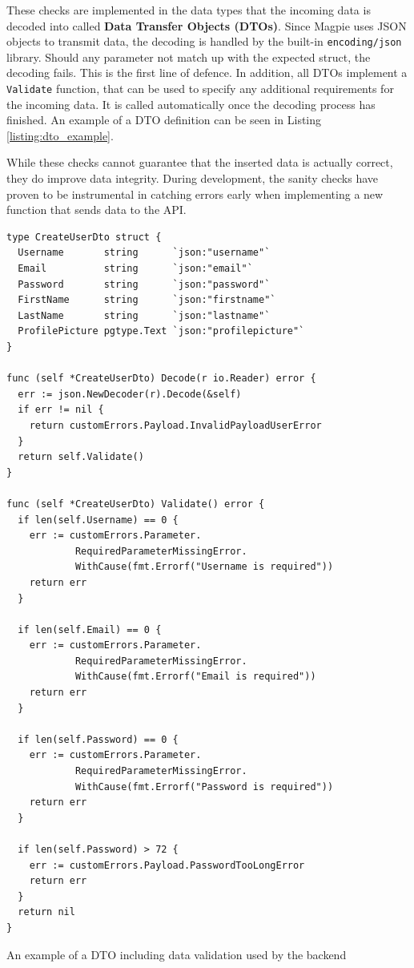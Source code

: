 These checks are implemented in the data types that the incoming data is decoded
into called \textbf{Data Transfer Objects (DTOs)}. Since Magpie uses JSON
objects to transmit data, the decoding is handled by the built-in
\texttt{encoding/json} library. Should any parameter not match up with the
expected struct, the decoding fails. This is the first line of defence. In
addition, all DTOs implement a \texttt{Validate} function, that can be used to
specify any additional requirements for the incoming data. It is called
automatically once the decoding process has finished. An example of a DTO
definition can be seen in Listing \ref{listing:dto_example}.

While these checks cannot guarantee that the inserted data is actually correct,
they do improve data integrity. During development, the sanity checks have
proven to be instrumental in catching errors early when implementing a new
function that sends data to the API.

\newpage{}

\begin{listing}[htbp]
  \centering{}
  \begin{minipage}{0.75\textwidth}
  \begin{verbatim}
type CreateUserDto struct {
  Username       string      `json:"username"`
  Email          string      `json:"email"`
  Password       string      `json:"password"`
  FirstName      string      `json:"firstname"`
  LastName       string      `json:"lastname"`
  ProfilePicture pgtype.Text `json:"profilepicture"`
}

func (self *CreateUserDto) Decode(r io.Reader) error {
  err := json.NewDecoder(r).Decode(&self)
  if err != nil {
    return customErrors.Payload.InvalidPayloadUserError
  }
  return self.Validate()
}

func (self *CreateUserDto) Validate() error {
  if len(self.Username) == 0 {
    err := customErrors.Parameter.
            RequiredParameterMissingError.
            WithCause(fmt.Errorf("Username is required"))
    return err
  }

  if len(self.Email) == 0 {
    err := customErrors.Parameter.
            RequiredParameterMissingError.
            WithCause(fmt.Errorf("Email is required"))
    return err
  }

  if len(self.Password) == 0 {
    err := customErrors.Parameter.
            RequiredParameterMissingError.
            WithCause(fmt.Errorf("Password is required"))
    return err
  }

  if len(self.Password) > 72 {
    err := customErrors.Payload.PasswordTooLongError
    return err
  }
  return nil
}
  \end{verbatim}
  \end{minipage}
  \caption{An example of a DTO including data validation used by the backend}
  \label{listing:dto_example}
\end{listing}

